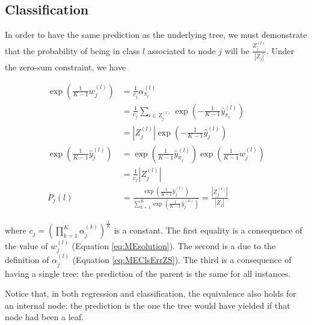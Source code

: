 \documentclass{article}
\begin{document}
\subsection{Classification}
In order to have the same prediction as the underlying tree, we must 
demonstrate that the probability of being in class $l$ associated to node $j$ 
will be $\frac{Z_j^{(l)}}{|Z_j|}$.
Under the zero-sum constraint, we have

\begin{align} 
\exp \left(  \frac{1}{K-1} w_j^{(l)}\right) &= \frac{1}{c_j} 
\alpha_{\pi_i}^{(l)} \\
&=  \frac{1}{c_j} \sum_{i \in Z_j^{(l)}} \exp \left(-\frac{1}{K-1} 
\hat{y}_{\pi_i}^{(l)}\right)\\
&= |Z_j^{(l)}| \exp \left(-\frac{1}{K-1} \hat{y}_j^{(l)}\right) \\
\exp \left(\frac{1}{K-1} \hat{y}_j^{(l)} \right) &= \exp \left(\frac{1}{K-1} 
\hat{y}_{\pi_j}^{(l)} \right) \exp \left(\frac{1}{K-1} w_j^{(l)}\right) \\
&= \frac{1}{c_j} |Z_j^{(l)}| \\
P_j(l) &= \frac{\exp \left(\frac{1}{K-1} \hat{y}_j^{(l)}
\right)}{\sum_{k=1}^K\exp \left(\frac{1}{K-1} \hat{y}_j^{(k)} \right)} = 
\frac{|Z_j^{(l)}|}{|Z_j|}
\end{align}

where $c_j = \left(\prod_{k=1}^K \alpha_j^{(k)}\right)^{\frac{1}{K}}$ is a 
constant. The first equality is a consequence of the value of $w_j^{(l)}$ 
(Equation \ref{eq:MEsolution}). The second is a due to the definition of 
$\alpha_j^{(l)}$ (Equation \ref{eq:MEClsErrZS}). The third is a consequence of 
having a single tree: the prediction of the parent is the same for all 
instances.





Notice that, in both regression and classification, the equivalence also holds 
for an internal node: the prediction is the one the tree would have yielded if 
that node had been a leaf.




\end{document}
